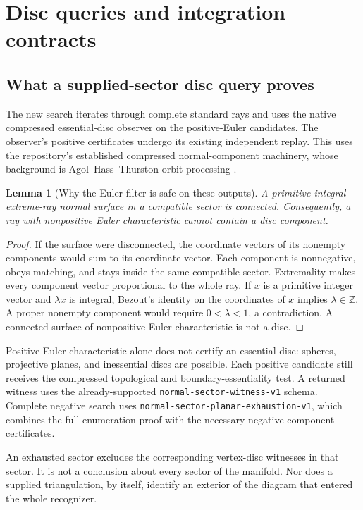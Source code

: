 \documentclass[11pt,letterpaper]{article}
\newtheorem{lemma}[theorem]{Lemma}
\theoremstyle{definition}
\theoremstyle{remark}\newtheorem{remark}[theorem]{Remark}
\newcommand{\Z}{\mathbb Z}\newcommand{\N}{\mathbb N}
\newcommand{\code}[1]{\nolinkurl{#1}}
\begin{document}
\section{Disc queries and integration contracts}
\label{sec:integration}

\subsection{What a supplied-sector disc query proves}

The new search iterates through complete standard rays and uses the native
compressed essential-disc observer on the positive-Euler candidates.
The observer's positive certificates undergo its existing independent
replay. This uses the repository's established compressed normal-component
machinery, whose background is Agol--Hass--Thurston orbit processing
\cite{aht}.

\begin{lemma}[Why the Euler filter is safe on these outputs]
A primitive integral extreme-ray normal surface in a compatible sector
is connected. Consequently, a ray with nonpositive Euler characteristic
cannot contain a disc component.
\end{lemma}

\begin{proof}
If the surface were disconnected, the coordinate vectors of its nonempty
components would sum to its coordinate vector. Each component is
nonnegative, obeys matching, and stays inside the same compatible sector.
Extremality makes every component vector proportional to the whole ray.
If $x$ is a primitive integer vector and $\lambda x$ is integral, Bezout's
identity on the coordinates of $x$ implies $\lambda\in\Z$.
A proper nonempty component would require $0<\lambda<1$, a contradiction.
A connected surface of nonpositive Euler characteristic is not a disc.
\end{proof}

Positive Euler characteristic alone does not certify an essential disc:
spheres, projective planes, and inessential discs are possible. Each
positive candidate still receives the compressed topological and
boundary-essentiality test. A returned witness uses the already-supported
\code{normal-sector-witness-v1} schema. Complete negative search uses
\code{normal-sector-planar-exhaustion-v1}, which combines the full
enumeration proof with the necessary negative component certificates.

An exhausted sector excludes the corresponding vertex-disc witnesses in
that sector. It is not a conclusion about every sector of the manifold.
Nor does a supplied triangulation, by itself, identify an exterior of the
diagram that entered the whole recognizer.
\end{document}

